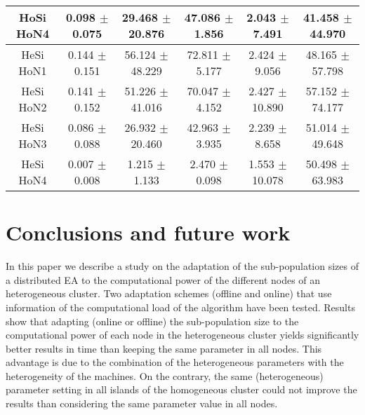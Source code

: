 \documentclass[final,1p,times]{elsarticle}
\begin{document}
\begin{table}[htb]
{\begin{tabular}{|c|c|c|c|c|c|}
HoSi HoN4  &  0.098 $\pm$  0.075  & 29.468 $\pm$ 20.876 & 47.086 $\pm$ 1.856 &  2.043 $\pm$  7.491 &  41.458 $\pm$ 44.970 \\ \hline \hline
HeSi HoN1 &   0.144 $\pm$  0.151 &  56.124 $\pm$ 48.229 & 72.811 $\pm$ 5.177  & 2.424 $\pm$  9.056  & 48.165  $\pm$57.798 \\ \hline
HeSi HoN2 &   0.141 $\pm$  0.152 &  51.226 $\pm$ 41.016 & 70.047 $\pm$ 4.152  & 2.427 $\pm$  10.890 & 57.152  $\pm$74.177 \\ \hline
HeSi HoN3 &   0.086 $\pm$  0.088 &  26.932 $\pm$ 20.460 & 42.963 $\pm$ 3.935  & 2.239 $\pm$  8.658  & 51.014  $\pm$49.648 \\ \hline
HeSi HoN4 &   0.007 $\pm$  0.008 &  1.215  $\pm$ 1.133  & 2.470  $\pm$ 0.098  & 1.553 $\pm$  10.078 & 50.498 $\pm$ 63.983 \\ \hline
\end{tabular}
}
\label{tab:onemaxtimes}
\end{table}

\section{Conclusions and future work}




In this paper we describe a study on the adaptation of the sub-population sizes of a distributed EA to the computational power of the different nodes of an heterogeneous cluster. Two adaptation schemes (offline and online) that use information of the computational load of the algorithm have been tested.
Results show that adapting (online or offline) the sub-population size to the computational power of each node in the heterogeneous cluster yields significantly
better results in time than keeping the same parameter in all nodes. This advantage is due to the combination of the heterogeneous parameters with the heterogeneity of the machines. On the contrary, the same (heterogeneous) parameter setting in all islands of the homogeneous cluster could not improve the results than considering the same parameter value in all nodes.


\end{document}
